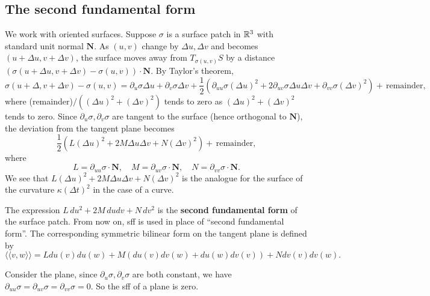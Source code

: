 \subsection{The second fundamental form}
We work with oriented surfaces. Suppose $\sigma$ is a surface patch in $\mathbb{R}^3$ with standard unit normal $\mathbf N$. As $(u,v)$ change by $\Delta u,\Delta v$ and becomes $(u+\Delta u,v+\Delta v)$, the surface moves away from $T_{\sigma(u,v)}S$ by a distance $(\sigma(u+\Delta u, v+\Delta v)-\sigma(u,v))\cdot \mathbf N$. By Taylor's theorem, \[
    \sigma(u+\Delta ,v+\Delta v)-\sigma(u,v)=\partial _u\sigma \Delta u+\partial _v\sigma \Delta v+\frac{1}{2}(\partial _{uu}\sigma(\Delta u)^2+2\partial _{uv}\sigma \Delta u \Delta v+\partial _{vv}\sigma(\Delta v)^2)+ \, \text{remainder},
\] where (remainder)$/ ((\Delta u)^2+(\Delta v)^2)$ tends to zero as $(\Delta u)^2+(\Delta v)^2$ tends to zero. Since $\partial _u\sigma,\partial _v\sigma$ are tangent to the surface (hence orthogonal to $\mathbf N$), the deviation from the tangent plane becomes \[
\frac{1}{2}\left( L(\Delta u)^2+2M\Delta u\Delta v+N(\Delta v)^2 \right) + \, \text{remainder} ,
\] where \[
L= \partial _{uu}\sigma \cdot \mathbf N,\quad M=\partial _{uv}\sigma \cdot \mathbf N, \quad N=\partial _{vv}\sigma \cdot \mathbf N.
\] 
We see that $L(\Delta u)^2+2M \Delta u\Delta v+N(\Delta v)^2$ is the analogue for the surface of the curvature $\kappa(\Delta t)^2$ in the case of a curve. 
\begin{definition}[]
    The expression $L \, du^2+2M\, dudv +N\, dv^2$ is the \textbf{second fundamental form} of the surface patch. From now on, sff is used in place of ``second fundamental form''. The corresponding symmetric bilinear form on the tangent plane is defined by \[
\langle \langle v,w \rangle  \rangle =Ldu(v)du(w)+M(du(v)dv(w)+du(w)dv(v))+Ndv(v)dv(w).
\] 
\end{definition}\begin{example}
    Consider the plane, since $\partial _u\sigma,\partial _v\sigma$ are both constant, we have $\partial _{uu}\sigma=\partial _{uv}\sigma=\partial _{vv}\sigma=0$. So the sff of a plane is zero.
\end{example}

